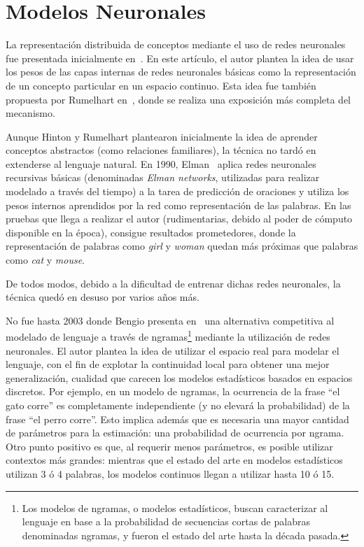 \section{Modelos Neuronales}

La representación distribuida de conceptos mediante el uso de redes neuronales fue presentada
inicialmente en~\cite{Hinton1986}. En este artículo, el autor plantea la idea de usar los pesos de
las capas internas de redes neuronales básicas como la representación de un concepto particular en
un espacio continuo. Esta idea fue también propuesta por Rumelhart en~\cite{Rumelhart1986}, donde se
realiza una exposición más completa del mecanismo.

Aunque Hinton y Rumelhart plantearon inicialmente la idea de aprender conceptos abstractos (como
relaciones familiares), la técnica no tardó en extenderse al lenguaje natural. En 1990,
Elman~\cite{Elman1990} aplica redes neuronales recursivas básicas (denominadas \textit{Elman
networks}, utilizadas para realizar modelado a través del tiempo) a la tarea de predicción de
oraciones y utiliza los pesos internos aprendidos por la red como representación de las palabras. En
las pruebas que llega a realizar el autor (rudimentarias, debido al poder de cómputo disponible en
la época), consigue resultados prometedores, donde la representación de palabras como \textit{girl}
y \textit{woman} quedan más próximas que palabras como \textit{cat} y \textit{mouse}.

De todos modos, debido a la dificultad de entrenar dichas redes neuronales, la técnica quedó en
desuso por varios años más.

No fue hasta 2003 donde Bengio presenta en~\cite{Bengio2003} una alternativa competitiva al modelado
de lenguaje a través de ngramas\footnote{Los modelos de ngramas, o modelos estadísticos, buscan
caracterizar al lenguaje en base a la probabilidad de secuencias cortas de palabras denominadas
ngramas, y fueron el estado del arte hasta la década pasada.} mediante la utilización de redes
neuronales. El autor plantea la idea de utilizar el espacio real para modelar el lenguaje, con el
fin de explotar la continuidad local para obtener una mejor generalización, cualidad que carecen los
modelos estadísticos basados en espacios discretos. Por ejemplo, en un modelo de ngramas, la
ocurrencia de la frase ``el gato corre'' es completamente independiente (y no elevará la
probabilidad) de la frase ``el perro corre''. Esto implica además que es necesaria una mayor
cantidad de parámetros para la estimación: una probabilidad de ocurrencia por ngrama. Otro punto
positivo es que, al requerir menos parámetros, es posible utilizar contextos más grandes: mientras
que el estado del arte en modelos estadísticos utilizan 3 ó 4 palabras, los modelos continuos llegan
a utilizar hasta 10 ó 15.

